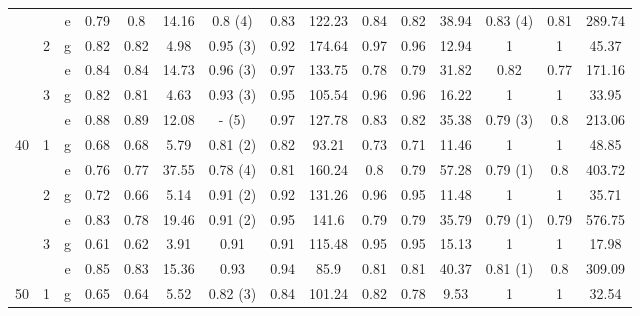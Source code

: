 \documentclass[10pt,a4paper]{elsarticle}
\begin{document}
\begin{table}[h!]
{\begin{tabular}{|c|c|c||ccc|ccc||ccc|ccc|}
&       & e     & 0.79  & 0.8   & 14.16 & \textcolor[rgb]{ 1,  0,  0}{0.8 (4)} & 0.83  & 122.23 & 0.84  & 0.82  & 38.94 & \textcolor[rgb]{ 1,  0,  0}{0.83 (4)} & 0.81  & 289.74 \bigstrut[b]\\
\cline{2-15}          & \multirow{2}[2]{*}{2} & g     & 0.82  & 0.82  & 4.98  & \textcolor[rgb]{ 1,  0,  0}{0.95 (3)} & 0.92  & 174.64 & 0.97  & 0.96  & 12.94 & 1     & 1     & 45.37 \bigstrut[t]\\
&       & e     & 0.84  & 0.84  & 14.73 & \textcolor[rgb]{ 1,  0,  0}{0.96 (3)} & 0.97  & 133.75 & 0.78  & 0.79  & 31.82 & 0.82  & 0.77  & 171.16 \bigstrut[b]\\
\cline{2-15}          & \multirow{2}[2]{*}{3} & g     & 0.82  & 0.81  & 4.63  & \textcolor[rgb]{ 1,  0,  0}{0.93 (3)} & 0.95  & 105.54 & 0.96  & 0.96  & 16.22 & 1     & 1     & 33.95 \bigstrut[t]\\
&       & e     & 0.88  & 0.89  & 12.08 & \textcolor[rgb]{ 1,  0,  0}{- (5)} & 0.97  & 127.78 & 0.83  & 0.82  & 35.38 & \textcolor[rgb]{ 1,  0,  0}{0.79 (3)} & 0.8   & 213.06 \bigstrut[b]\\
\hline
\hline
\multirow{6}[6]{*}{40} & \multirow{2}[2]{*}{1} & g     & 0.68  & 0.68  & 5.79  & \textcolor[rgb]{ 1,  0,  0}{0.81 (2)} & 0.82  & 93.21 & 0.73  & 0.71  & 11.46 & 1     & 1     & 48.85 \bigstrut[t]\\
&       & e     & 0.76  & 0.77  & 37.55 & \textcolor[rgb]{ 1,  0,  0}{0.78 (4)} & 0.81  & 160.24 & 0.8   & 0.79  & 57.28 & \textcolor[rgb]{ 1,  0,  0}{0.79 (1)} & 0.8   & 403.72 \bigstrut[b]\\
\cline{2-15}          & \multirow{2}[2]{*}{2} & g     & 0.72  & 0.66  & 5.14  & \textcolor[rgb]{ 1,  0,  0}{0.91 (2)} & 0.92  & 131.26 & 0.96  & 0.95  & 11.48 & 1     & 1     & 35.71 \bigstrut[t]\\
&       & e     & 0.83  & 0.78  & 19.46 & \textcolor[rgb]{ 1,  0,  0}{0.91 (2)} & 0.95  & 141.6 & 0.79  & 0.79  & 35.79 & \textcolor[rgb]{ 1,  0,  0}{0.79 (1)} & 0.79  & 576.75 \bigstrut[b]\\
\cline{2-15}          & \multirow{2}[2]{*}{3} & g     & 0.61  & 0.62  & 3.91  & 0.91  & 0.91  & 115.48 & 0.95  & 0.95  & 15.13 & 1     & 1     & 17.98 \bigstrut[t]\\
&       & e     & 0.85  & 0.83  & 15.36 & 0.93  & 0.94  & 85.9  & 0.81  & 0.81  & 40.37 & \textcolor[rgb]{ 1,  0,  0}{0.81 (1)} & 0.8   & 309.09 \bigstrut[b]\\
\hline
\hline
\multirow{6}[6]{*}{50} & \multirow{2}[2]{*}{1} & g     & 0.65  & 0.64  & 5.52  & \textcolor[rgb]{ 1,  0,  0}{0.82 (3)} & 0.84  & 101.24 & 0.82  & 0.78  & 9.53  & 1     & 1     & 32.54 \bigstrut[t]\\

\end{tabular}}
\end{table}
\end{document}
